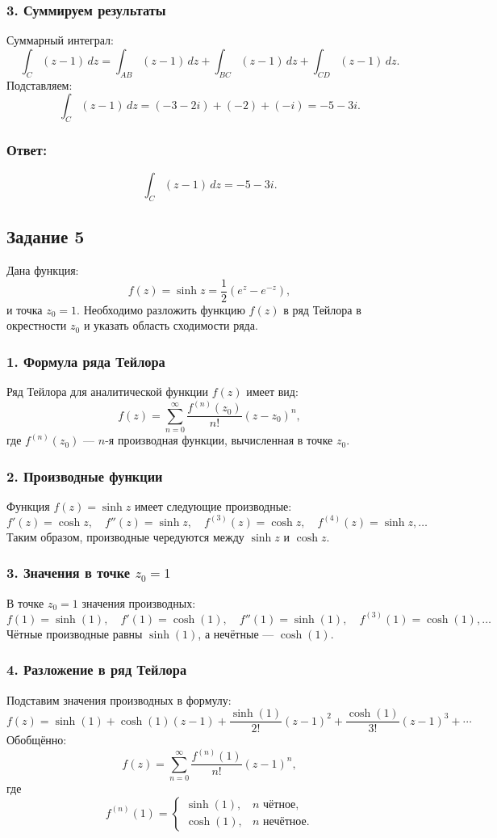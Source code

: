 \documentclass[a4paper,12pt]{article}
\begin{document}
\subsubsection*{3. Суммируем результаты}
Суммарный интеграл:
\[
\int_C (z - 1) \, dz = \int_{AB} (z - 1) \, dz + \int_{BC} (z - 1) \, dz + \int_{CD} (z - 1) \, dz.
\]
Подставляем:
\[
\int_C (z - 1) \, dz = (-3 - 2i) + (-2) + (-i) = -5 - 3i.
\]

\subsubsection*{Ответ:}
\[
\int_C (z - 1) \, dz = -5 - 3i.
\]

\subsection*{Задание 5}

Дана функция:
\[
f(z) = \sinh z = \frac{1}{2} \left( e^z - e^{-z} \right),
\]
и точка \( z_0 = 1 \). Необходимо разложить функцию \( f(z) \) в ряд Тейлора в окрестности \( z_0 \) и указать область сходимости ряда.

\subsubsection*{1. Формула ряда Тейлора}
Ряд Тейлора для аналитической функции \( f(z) \) имеет вид:
\[
f(z) = \sum_{n=0}^\infty \frac{f^{(n)}(z_0)}{n!} (z - z_0)^n,
\]
где \( f^{(n)}(z_0) \) — \(n\)-я производная функции, вычисленная в точке \( z_0 \).

\subsubsection*{2. Производные функции}
Функция \( f(z) = \sinh z \) имеет следующие производные:
\[
f'(z) = \cosh z, \quad f''(z) = \sinh z, \quad f^{(3)}(z) = \cosh z, \quad f^{(4)}(z) = \sinh z, \ldots
\]
Таким образом, производные чередуются между \(\sinh z\) и \(\cosh z\).

\subsubsection*{3. Значения в точке \( z_0 = 1 \)}
В точке \( z_0 = 1 \) значения производных:
\[
f(1) = \sinh(1), \quad f'(1) = \cosh(1), \quad f''(1) = \sinh(1), \quad f^{(3)}(1) = \cosh(1), \ldots
\]
Чётные производные равны \(\sinh(1)\), а нечётные — \(\cosh(1)\).

\subsubsection*{4. Разложение в ряд Тейлора}
Подставим значения производных в формулу:
\[
f(z) = \sinh(1) + \cosh(1)(z-1) + \frac{\sinh(1)}{2!}(z-1)^2 + \frac{\cosh(1)}{3!}(z-1)^3 + \cdots
\]
Обобщённо:
\[
f(z) = \sum_{n=0}^\infty \frac{f^{(n)}(1)}{n!} (z - 1)^n,
\]
где
\[
f^{(n)}(1) = 
\begin{cases} 
\sinh(1), & n \text{ чётное}, \\
\cosh(1), & n \text{ нечётное}.
\end{cases}
\]
\end{document}
